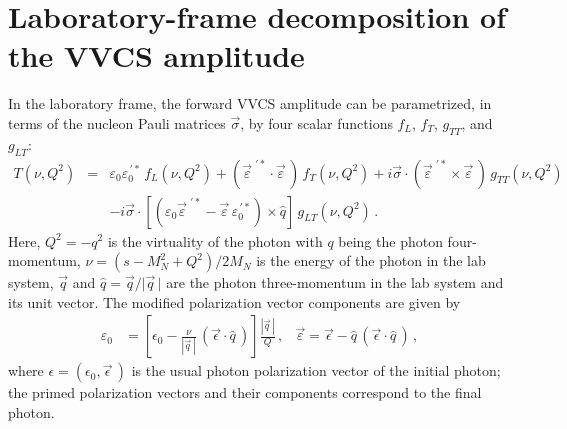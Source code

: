 \documentclass[11pt,preprint,tightenlines,
showpacs,preprintnumbers,amsmath,amssymb,superscriptaddress,a4paper,nofootinbib]{revtex4-1}
\def\bea{\begin{eqnarray}}
\def\eea{\end{eqnarray}}
\def\eqlab#1{\label{eq:#1}}
\def\seclab#1{\label{sec:#1}}
\def\nn{\nonumber}
\begin{document}
\section{Laboratory-frame decomposition of the VVCS amplitude}
\seclab{SRVVCStensor}
In the laboratory frame, the forward VVCS amplitude can be parametrized,
in terms of the nucleon Pauli matrices $\vec{\sigma}$, by four scalar functions $f_L$, $f_T$,
$g_{TT}$, and $g_{LT}$:
\bea\label{Eq:T-Compt-definition}
T(\nu,Q^2)&=&\varepsilon_0\varepsilon_0^{\,\prime*}\,f_{L}(\nu,Q^2) +(\vec{\varepsilon}^{\,\, \prime *} \cdot \vec{\varepsilon}\,) \,f_{T}(\nu,Q^2)  +  i \vec{\sigma}\cdot (\vec{\varepsilon}^{\,\, \prime *} \times \vec{\varepsilon}\,)\, g_{TT}(\nu,Q^2) \\
&&-  i \vec{\sigma}\cdot [(\varepsilon_0\vec{\varepsilon}^{\,\, \prime *} - \vec{\varepsilon}\,\varepsilon^{\,\prime *}_0)\times \hat{q}]\, g_{LT}(\nu,Q^2)\,.\nn 
\eea
Here, $Q^2=-q^2$ is the virtuality of the photon with $q$ being the photon four-momentum, $\nu=(s-M_N^2+Q^2)/2M_N$ is the energy of the photon in the lab system, $\vec q$ and $\hat{q}=\vec{q}/\vert \vec{q}\, \vert$ are the photon three-momentum in the lab system and its unit vector. The modified polarization vector components are given by
\begin{align}
\varepsilon_0&=\left[\epsilon_0-\frac{\nu}{\left|\vec q\,\right|}\, (\vec\epsilon\cdot\hat q\,)\right]\frac{\left|\vec q\,\right|}{Q}\,,
&\vec\varepsilon = \vec\epsilon-\hat q\,(\vec\epsilon\cdot\hat q\,)\,,\eqlab{modified_polarization_vectors}
\end{align}
 where $\epsilon=(\epsilon_0,\vec\epsilon\,)$ is the usual photon polarization vector of the initial photon; the primed
polarization vectors and their components  correspond to the final photon.
\end{document}
